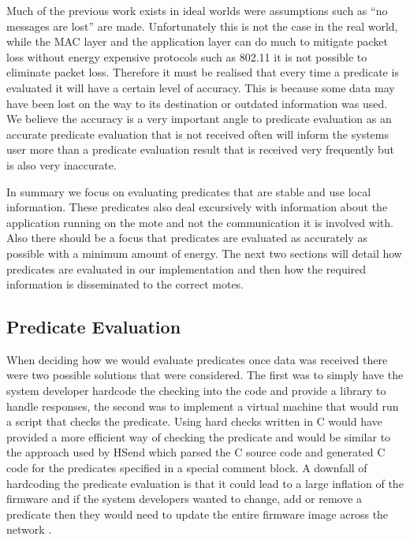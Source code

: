 Much of the previous work exists in ideal worlds were assumptions such as ``no messages are lost'' \cite{277788} are made. Unfortunately this is not the case in the real world, while the MAC layer and the application layer can do much to mitigate packet loss \cite{?} without energy expensive protocols such as 802.11 \cite{?} it is not possible to eliminate packet loss. Therefore it must be realised that every time a predicate is evaluated it will have a certain level of accuracy. This is because some data may have been lost on the way to its destination or outdated information was used. We believe the accuracy is a very important angle to predicate evaluation as an accurate predicate evaluation that is not received often will inform the systems user more than a predicate evaluation result that is received very frequently but is also very inaccurate.

In summary we focus on evaluating predicates that are stable and use local information. These predicates also deal excursively with information about the application running on the mote and not the communication it is involved with. Also there should be a focus that predicates are evaluated as accurately as possible with a minimum amount of energy. The next two sections will detail how predicates are evaluated in our implementation and then how the required information is disseminated to the correct motes.

\subsection{Predicate Evaluation}

When deciding how we would evaluate predicates once data was received there were two possible solutions that were considered. The first was to simply have the system developer hardcode the checking into the code and provide a library to handle responses, the second was to implement a virtual machine that would run a script that checks the predicate. Using hard checks written in C would have provided a more efficient way of checking the predicate and would be similar to the approach used by HSend \cite{herbert2007adaptive} which parsed the C source code and generated C code for the predicates specified in a special comment block. A downfall of hardcoding the predicate evaluation is that it could lead to a large inflation of the firmware and if the system developers wanted to change, add or remove a predicate then they would need to update the entire firmware image across the network \cite{Dunkels:2006:RDL:1182807.1182810,1437066}.

